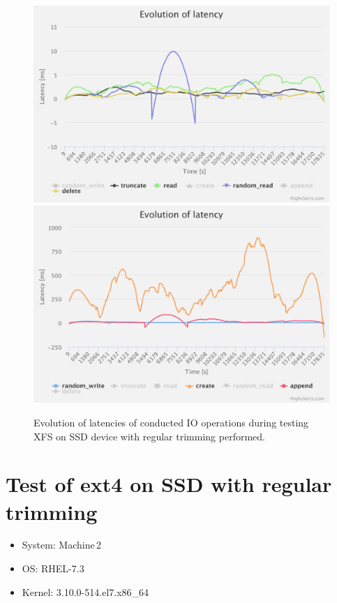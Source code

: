 \documentclass[
  color, %
  table, %
  lof,   %
  lot,   %
]{fithesis3}
\begin{document}
\begin{figure}[!htb]
    \centering
   \begin{minipage}{\textwidth}
        \centering
        \includegraphics[width=\textwidth]{../charts/SSD_xfs_trim/1}
        \includegraphics[width=\textwidth]{../charts/SSD_xfs_trim/2}
                \caption[Evolution of latencies of XFS during testing on SSD with regular trimming]{Evolution of latencies of conducted IO operations during testing XFS on SSD device with regular trimming performed.}
\label{fig:lats_xfs_ssd_trim}

    \end{minipage}
\end{figure}

\clearpage

\section{Test of ext4 on SSD with regular trimming}
\begin{itemize}
\itemsep0em 
   \item System: Machine\,2
   \item OS: RHEL-7.3
   \item Kernel: 3.10.0-514.el7.x86\_64
\end{itemize}
\end{document}
